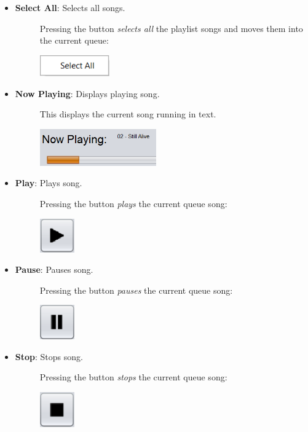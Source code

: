 \documentclass{article}
\begin{document}
\begin{itemize}
    \item \textbf{Select All}: Selects all songs.
    \begin{description}
        \item[] Pressing the button \textit{selects all} the playlist songs and moves them into the current queue:
        \item[] \includegraphics[width=3cm]{Images/Play Select All.png}
    \end{description}
    \item \textbf{Now Playing}: Displays playing song.
    \begin{description}
        \item[] This displays the current song running in text.
        \item[] \includegraphics[width=5cm]{Images/NowPlaying.png}
    \end{description}
    \item \textbf{Play}: Plays song.
    \begin{description}
        \item[] Pressing the button \textit{plays} the current queue song:
        \item[] \includegraphics[width=1.5cm]{Images/Play.png}
    \end{description}
    \item \textbf{Pause}: Pauses song.
    \begin{description}
        \item[] Pressing the button \textit{pauses} the current queue song:
        \item[] \includegraphics[width=1.5cm]{Images/Pause.png}
    \end{description}
    \item \textbf{Stop}: Stops song.
    \begin{description}
        \item[] Pressing the button \textit{stops} the current queue song:
        \item[] \includegraphics[width=1.5cm]{Images/Stop.png}
    \end{description}

\end{itemize}
\end{document}
